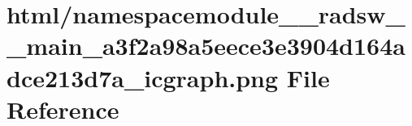 \hypertarget{namespacemodule____radsw____main__a3f2a98a5eece3e3904d164adce213d7a__icgraph_8png}{}\section{html/namespacemodule\+\_\+\+\_\+radsw\+\_\+\+\_\+main\+\_\+a3f2a98a5eece3e3904d164adce213d7a\+\_\+icgraph.png File Reference}
\label{namespacemodule____radsw____main__a3f2a98a5eece3e3904d164adce213d7a__icgraph_8png}
